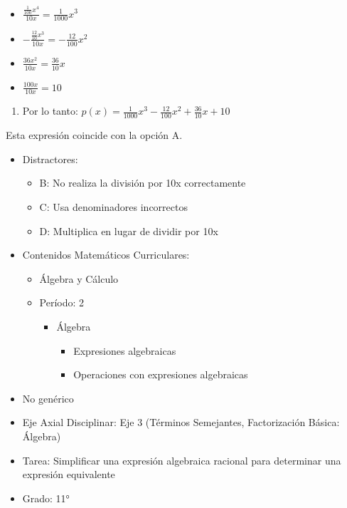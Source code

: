 \documentclass[
]{article}
\providecommand{\tightlist}{%
  \setlength{\itemsep}{0pt}\setlength{\parskip}{0pt}}
\begin{document}
\begin{itemize}
\tightlist
\item
  \(\frac{\frac{1}{100}x^4}{10x} = \frac{1}{1000}x^3\)
\item
  \(-\frac{\frac{12}{10}x^3}{10x} = -\frac{12}{100}x^2\)
\item
  \(\frac{36x^2}{10x} = \frac{36}{10}x\)
\item
  \(\frac{100x}{10x} = 10\)
\end{itemize}

\begin{enumerate}
\def\labelenumi{\arabic{enumi})}
\setcounter{enumi}{2}
\tightlist
\item
  Por lo tanto:
  \(p(x) = \frac{1}{1000}x^3 - \frac{12}{100}x^2 + \frac{36}{10}x + 10\)
\end{enumerate}

Esta expresión coincide con la opción A.

\begin{itemize}
\tightlist
\item
  Distractores:

  \begin{itemize}
  \tightlist
  \item
    B: No realiza la división por 10x correctamente
  \item
    C: Usa denominadores incorrectos
  \item
    D: Multiplica en lugar de dividir por 10x
  \end{itemize}
\item
  Contenidos Matemáticos Curriculares:

  \begin{itemize}
  \tightlist
  \item
    Álgebra y Cálculo
  \item
    Período: 2

    \begin{itemize}
    \tightlist
    \item
      Álgebra

      \begin{itemize}
      \tightlist
      \item
        Expresiones algebraicas
      \item
        Operaciones con expresiones algebraicas
      \end{itemize}
    \end{itemize}
  \end{itemize}
\item
  No genérico
\item
  Eje Axial Disciplinar: Eje 3 (Términos Semejantes, Factorización
  Básica: Álgebra)
\item
  Tarea: Simplificar una expresión algebraica racional para determinar
  una expresión equivalente
\item
  Grado: 11°
\end{itemize}
\end{document}
